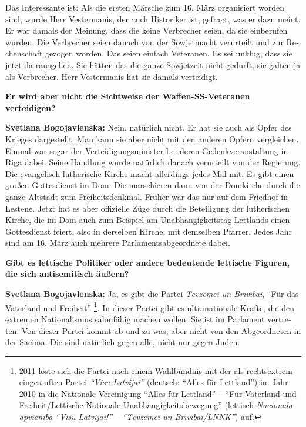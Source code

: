 \begin{otherlanguage}{ngerman}
Das Interessante ist: Als die ersten Märsche zum 16. März organisiert worden sind, wurde Herr Vestermanis, der auch Historiker ist, gefragt, was er dazu meint. Er war damals der Meinung, dass die keine Verbrecher seien, da sie einberufen wurden. Die Verbrecher seien danach von der Sowjetmacht verurteilt und zur Rechenschaft gezogen worden. Das seien einfach Veteranen. Es sei unklug, dass sie jetzt da rausgehen. Sie hätten das die ganze Sowjetzeit nicht gedurft, sie galten ja als Verbrecher. Herr Vestermanis hat sie damals verteidigt.

\sloppy
\textbf{Er wird aber nicht die Sichtweise der Waffen-SS-Veteranen verteidigen?}

\textbf{Svetlana Bogojavlenska:} Nein, natürlich nicht. Er hat sie auch als Opfer des Krieges dargestellt. Man kann sie aber nicht mit den anderen Opfern vergleichen. Einmal war sogar der Verteidigungsminister bei deren Gedenkveranstaltung in Riga dabei. Seine Handlung wurde natürlich danach verurteilt von der Regierung. Die evangelisch-lutherische Kirche macht allerdings jedes Mal mit. Es gibt einen großen Gottesdienst im Dom. Die marschieren dann von der Domkirche durch die ganze Altstadt zum Freiheitsdenkmal. Früher war das nur auf dem Friedhof in Lestene. Jetzt hat es aber offizielle Züge durch die Beteiligung der lutherischen Kirche, die im Dom auch zum Beispiel am Unabhängigkeitstag Lettlands einen Gottesdienst feiert, also in derselben Kirche, mit demselben Pfarrer. Jedes Jahr sind am 16. März auch mehrere Parlamentsabgeordnete dabei.

\textbf{Gibt es lettische Politiker oder andere bedeutende lettische Figuren, die sich antisemitisch äußern?}

\textbf{Svetlana Bogojavlenska:} Ja, es gibt die Partei \textit{Tēvzemei un Brīvībai}, "`Für das Vaterland und Freiheit"' \footnote{2011 löste sich die Partei nach einem Wahlbündnis mit der als rechtsextrem eingestuften Partei \textit{"`Visu Latvijai"'} (deutsch: "`Alles für Lettland"') im Jahr 2010 in die Nationale Vereinigung "`Alles für Lettland"' – "`Für Vaterland und Freiheit/Lettische Nationale Unabhängigkeitsbewegung"' (lettisch \textit{Nacionālā apvienība "`Visu Latvijai!"' – "`Tēvzemei un Brīvībai/LNNK"'}) auf.}. In dieser Partei gibt es ultranationale Kräfte, die den extremen Nationalismus salonfähig machen wollen. Sie ist im Parlament vertreten. Von dieser Partei kommt ab und zu was, aber nicht von den Abgeordneten in der Saeima. Die sind natürlich gegen alle, nicht nur gegen Juden.


\end{otherlanguage}
